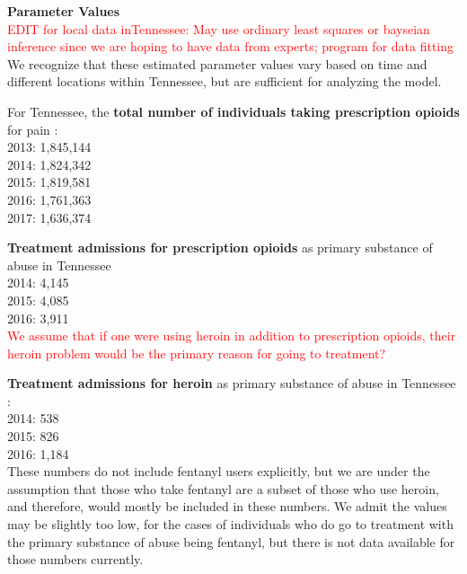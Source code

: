 \documentclass[12pt]{article}
\begin{document}
 \textbf{Parameter Values} \\

\textcolor{red}{EDIT for local data inTennessee: May use ordinary least squares or bayseian inference since we are hoping to have data from experts; program for data fitting} \\ 
We recognize that these estimated parameter values vary based on time and different locations within Tennessee, but are sufficient for analyzing the model. 




For Tennessee, the \textbf{total number of individuals taking prescription opioids} for pain \cite{TNgov1}: \\
2013: 1,845,144 \\
2014: 1,824,342 \\
2015: 1,819,581 \\
2016: 1,761,363 \\
2017: 1,636,374 

\textbf{Treatment admissions for prescription opioids} as primary substance of abuse in Tennessee \cite{TNMentalHealth}\\ %
2014: 4,145\\
2015: 4,085 \\
2016: 3,911 \\
\textcolor{red}{We assume that if one were using heroin in addition to prescription opioids, their heroin problem would be the primary reason for going to treatment?}

\textbf{Treatment admissions for heroin} as primary substance of abuse in Tennessee \cite{TNMentalHealth}:  \\
2014: 538 \\
2015: 826 \\
2016: 1,184 \\
These numbers do not include fentanyl users explicitly, but we are under the assumption that those who take fentanyl are a subset of those who use heroin, and therefore, would mostly be included in these numbers. We admit the values may be slightly too low, for the cases of individuals who do go to treatment with the primary substance of abuse being fentanyl, but there is not data available for those numbers currently. 
\end{document}
